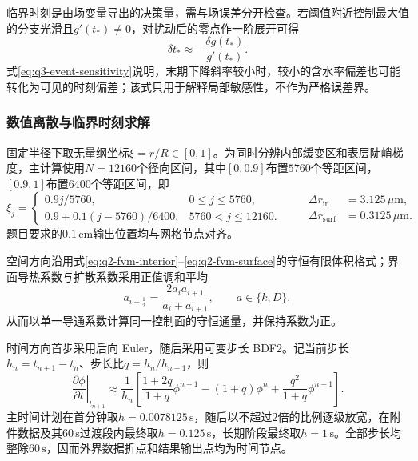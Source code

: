 \documentclass[withoutpreface,bwprint]{cumcmthesis}
\begin{document}
临界时刻是由场变量导出的决策量，需与场误差分开检查。若阈值附近控制最大值的分支光滑且$g'(t_*)\ne0$，对扰动后的零点作一阶展开可得
\begin{equation}
\delta t_*
\approx-\frac{\delta g(t_*)}{g'(t_*)}.
\label{eq:q3-event-sensitivity}
\end{equation}
式\eqref{eq:q3-event-sensitivity}说明，末期下降斜率较小时，较小的含水率偏差也可能转化为可见的时刻偏差；该式只用于解释局部敏感性，不作为严格误差界。

\subsubsection{数值离散与临界时刻求解}

固定半径下取无量纲坐标$\xi=r/R\in[0,1]$。为同时分辨内部缓变区和表层陡峭梯度，主计算使用$N=12160$个径向区间，其中$[0,0.9]$布置$5760$个等距区间，$[0.9,1]$布置$6400$个等距区间，即
\begin{equation}
\xi_j=
\begin{cases}
0.9j/5760, & 0\le j\le5760,\\
0.9+0.1(j-5760)/6400, & 5760<j\le12160.
\end{cases}
\qquad
\begin{aligned}
\Delta r_{\mathrm{in}}&=3.125\,\mu\mathrm m,\\
\Delta r_{\mathrm{surf}}&=0.3125\,\mu\mathrm m.
\end{aligned}
\label{eq:q3-space-grid}
\end{equation}
题目要求的$0.1\,\mathrm{cm}$输出位置均与网格节点对齐。

空间方向沿用式\eqref{eq:q2-fvm-interior}--\eqref{eq:q2-fvm-surface}的守恒有限体积格式；界面导热系数与扩散系数采用正值调和平均
\begin{equation}
a_{i+\frac12}
=\frac{2a_i a_{i+1}}{a_i+a_{i+1}},
\qquad a\in\{k,D\},
\label{eq:q3-face-harmonic}
\end{equation}
从而以单一导通系数计算同一控制面的守恒通量，并保持系数为正。

时间方向首步采用后向 Euler，随后采用可变步长 BDF2\cite{hairer1996}。记当前步长$h_n=t_{n+1}-t_n$、步长比$q=h_n/h_{n-1}$，则
\begin{equation}
\left.\frac{\partial\phi}{\partial t}\right|_{t_{n+1}}
\approx\frac{1}{h_n}
\left[
\frac{1+2q}{1+q}\phi^{n+1}
-(1+q)\phi^n
+\frac{q^2}{1+q}\phi^{n-1}
\right].
\label{eq:q3-bdf2}
\end{equation}
主时间计划在首分钟取$h=0.0078125\,\mathrm s$，随后以不超过$2$倍的比例逐级放宽，在附件数据及其$60\,\mathrm s$过渡段内最终取$h=0.125\,\mathrm s$，长期阶段最终取$h=1\,\mathrm s$。全部步长均整除$60\,\mathrm s$，因而外界数据折点和结果输出点均为时间节点。
\end{document}
